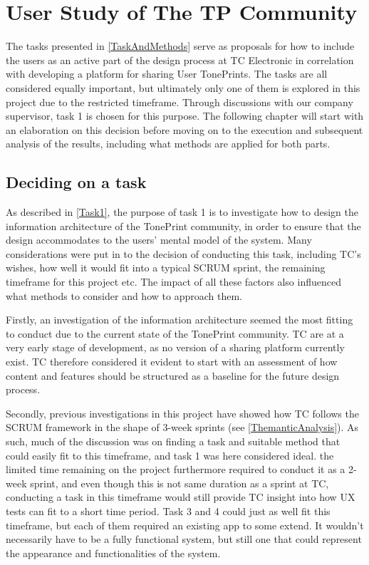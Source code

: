 \chapter{User Study of The TP Community}
\label{ChapterWorkshop}
The tasks presented in \autoref{TaskAndMethods} serve as proposals for how to include the users as an active part of the design process at TC Electronic in correlation with developing a platform for sharing User TonePrints. The tasks are all considered equally important, but ultimately only one of them is explored in this project due to the restricted timeframe. Through discussions with our company supervisor, task 1 is chosen for this purpose. The following chapter will start with an elaboration on this decision before moving on to the execution and subsequent analysis of the results, including what methods are applied for both parts.

\section{Deciding on a task}
\label{TaskDecision}
As described in \autoref{Task1}, the purpose of task 1 is to investigate how to design the information architecture of the TonePrint community, in order to ensure that the design accommodates to the users' mental model of the system. Many considerations were put in to the decision of conducting this task, including TC's wishes, how well it would fit into a typical SCRUM sprint, the remaining timeframe for this project etc. The impact of all these factors also influenced what methods to consider and how to approach them.

Firstly, an investigation of the information architecture seemed the most fitting to conduct due to the current state of the TonePrint community. TC are at a very early stage of development, as no version of a sharing platform currently exist. TC therefore considered it evident to start with an assessment of how content and features should be structured as a baseline for the future design process.

Secondly, previous investigations in this project have showed how TC follows the SCRUM framework in the shape of 3-week sprints (see \autoref{ThemanticAnalysis}). As such, much of the discussion was on finding a task and suitable method that could easily fit to this timeframe, and task 1 was here considered ideal. the limited time remaining on the project furthermore required to conduct it as a 2-week sprint, and even though this is not same duration as a sprint at TC, conducting a task in this timeframe would still provide TC insight into how UX tests can fit to a short time period. Task 3 and 4 could just as well fit this timeframe, but each of them required an existing app to some extend. It wouldn't necessarily have to be a fully functional system, but still one that could represent the appearance and functionalities of the system.

